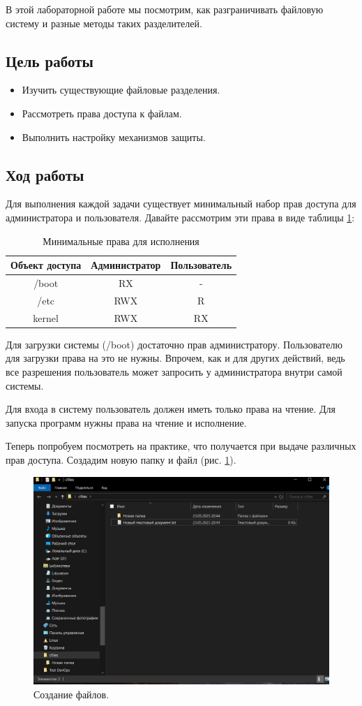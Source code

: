 В этой лабораторной работе мы посмотрим, как разграничивать файловую систему и разные методы таких разделителей.

\label{LAB3}
\subsection{Цель работы}
\begin{itemize}
    \item Изучить существующие файловые разделения.
    \item Рассмотреть права доступа к файлам.
    \item Выполнить настройку механизмов защиты.
\end{itemize}
\subsection{Ход работы}

Для выполнения каждой задачи существует минимальный набор прав доступа для администратора и пользователя. Давайте рассмотрим эти права в виде таблицы \ref{tab:31}:

\begin{table}[h!]
    \centering
    \begin{tabular}{|c|c|c|}
    \hline
    Объект доступа&Администратор&Пользователь\\
    \hline
    /boot&RX&-\\
    /etc&RWX&R\\
    kernel&RWX&RX\\
    \hline
    \end{tabular}
    \caption{Минимальные права для исполнения}
    \label{tab:31}
\end{table}

Для загрузки системы (/boot) достаточно прав администратору. Пользователю для загрузки права на это не нужны. Впрочем, как и для других действий, ведь все разрешения пользователь может запросить у администратора внутри самой системы.

Для входа в систему пользователь должен иметь только права на чтение. Для запуска программ нужны права на чтение и исполнение.

Теперь попробуем посмотреть на практике, что получается при выдаче различных прав доступа. Создадим новую папку и файл (рис. \ref{fig:filecreat}).

\begin{figure}[h!]
    \centering
    \includegraphics[width=0.5\linewidth]{Pic/lab3/photo_2025-05-23_20-58-47.jpg}
    \caption{Создание файлов.}
    \label{fig:filecreat}
\end{figure}


